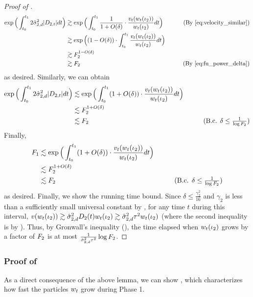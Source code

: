 \begin{proof}[Proof of ]
\begin{align}
\exp\Big(\int_{t_0}^{t_1} 2 \sigmaCoeffTwo^2 |D_{2, t}| dt \Big)
& \gtrsim \exp\Big(\int_{t_0}^{t_1} \frac{1}{1 + O(\delta)} \cdot \frac{\vel_t(\w_t(\iota_2))}{\w_t(\iota_2)} dt \Big)
& \tag{By \Cref{eq:velocity_similar}} \\
& \gtrsim \exp\Big((1 - O(\delta)) \cdot \int_{t_0}^{t_1} \frac{v_t(\w_t(\iota_2))}{\w_t(\iota_2)} dt\Big) \\
& \gtrsim \F_2^{1 - O(\delta)} \\
& \gtrsim \F_2
& \tag{By \Cref{eq:fu_power_delta}}
\end{align}
as desired. Similarly, we can obtain
\begin{align}
\exp\Big(\int_{t_0}^{t_1} 2 \sigmaCoeffTwo^2 |D_{2, t}| dt \Big)
& \lesssim \exp\Big(\int_{t_0}^{t_1} (1 + O(\delta)) \cdot \frac{\vel_t(\w_t(\iota_2))}{\w_t(\iota_2)} dt \Big) \\
& \lesssim \F_2^{1 + O(\delta)} \\
& \lesssim \F_2
& \tag{B.c. $\delta \leq \frac{1}{\log \F_2}$}
\end{align}
Finally,
\begin{align}
\F_1
& \lesssim \exp\Big(\int_{t_0}^{t_1} (1 + O(\delta)) \cdot \frac{\vel_t(\w_t(\iota_2))}{\w_t(\iota_2)} dt \Big) \\
& \lesssim \F_2^{1 + O(\delta)} \\
& \lesssim \F_2 
& \tag{B.c. $\delta \leq \frac{1}{\log \F_2}$}
\end{align}
as desired. Finally, we show the running time bound. Since $\delta \leq \frac{\gamma_2^2}{16}$ and $\gamma_2$ is less than a sufficiently small universal constant by , for any time $t$ during this interval, $v(w_t(\iota_2)) \gtrsim \hat{\sigma}_{2, d}^2 D_2(t) w_t(\iota_2) \gtrsim \hat{\sigma}_{2, d}^2 \tau^2 w_t(\iota_2)$ (where the second inequality is by ). Thus, by Gronwall's inequality (), the time elapsed when $w_t(\iota_2)$ grows by a factor of $F_2$ is at most $\frac{1}{\hat{\sigma}_{2, d}^2 \tau^2} \log F_2$.
\end{proof}

\subsubsection{Proof of }

As a direct consequence of the above lemma, we can show , which characterizes how fast the particles $w_t$ grow during Phase 1.


